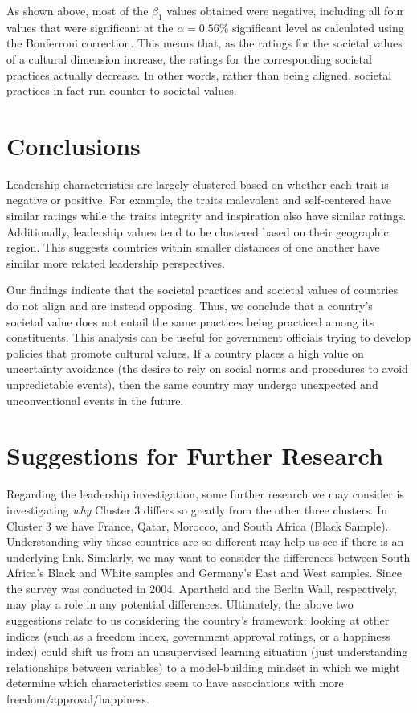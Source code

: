 \documentclass[
]{article}
\begin{document}
As shown above, most of the \(\beta_1\) values obtained were negative,
including all four values that were significant at the
\(\alpha = 0.56\)\% significant level as calculated using the Bonferroni
correction. This means that, as the ratings for the societal values of a
cultural dimension increase, the ratings for the corresponding societal
practices actually decrease. In other words, rather than being aligned,
societal practices in fact run counter to societal values.

\hypertarget{conclusions}{%
\section{Conclusions}\label{conclusions}}

Leadership characteristics are largely clustered based on whether each
trait is negative or positive. For example, the traits malevolent and
self-centered have similar ratings while the traits integrity and
inspiration also have similar ratings. Additionally, leadership values
tend to be clustered based on their geographic region. This suggests
countries within smaller distances of one another have similar more
related leadership perspectives.

Our findings indicate that the societal practices and societal values of
countries do not align and are instead opposing. Thus, we conclude that
a country's societal value does not entail the same practices being
practiced among its constituents. This analysis can be useful for
government officials trying to develop policies that promote cultural
values. If a country places a high value on uncertainty avoidance (the
desire to rely on social norms and procedures to avoid unpredictable
events), then the same country may undergo unexpected and unconventional
events in the future.

\hypertarget{suggestions-for-further-research}{%
\section{Suggestions for Further
Research}\label{suggestions-for-further-research}}

Regarding the leadership investigation, some further research we may
consider is investigating \emph{why} Cluster 3 differs so greatly from
the other three clusters. In Cluster 3 we have France, Qatar, Morocco,
and South Africa (Black Sample). Understanding why these countries are
so different may help us see if there is an underlying link. Similarly,
we may want to consider the differences between South Africa's Black and
White samples and Germany's East and West samples. Since the survey was
conducted in 2004, Apartheid and the Berlin Wall, respectively, may play
a role in any potential differences. Ultimately, the above two
suggestions relate to us considering the country's framework: looking at
other indices (such as a freedom index, government approval ratings, or
a happiness index) could shift us from an unsupervised learning
situation (just understanding relationships between variables) to a
model-building mindset in which we might determine which characteristics
seem to have associations with more freedom/approval/happiness.
\end{document}
